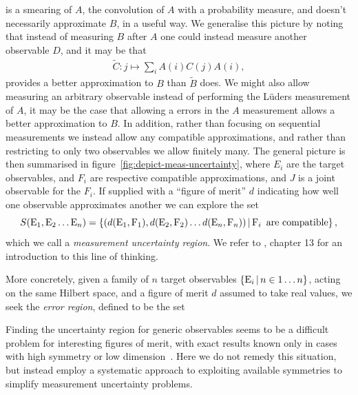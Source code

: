 is a smearing of $A$, the convolution of $A$ with a probability measure, and doesn't necessarily approximate $B$, in a useful way. We generalise this picture by noting that instead of measuring $B$ after $A$ one could instead measure another observable $D$, and it may be that
\begin{align}
  \tilde{C}:j\mapsto \sum_i A(i)C(j)A(i),
\end{align}
provides a better approximation to $B$ than $\tilde{B}$ does. We might also allow measuring an arbitrary observable instead of performing the L\"uders measurement of $A$, it may be the case that allowing a errors in the $A$ measurement allows a better approximation to $B$. In addition, rather than focusing on sequential measurements we instead allow any compatible approximations, and rather than restricting to only two observables we allow finitely many.  The general picture is then summarised in figure~\ref{fig:depict-meas-uncertainty}, where $E_i$ are the target observables, and $F_i$ are respective compatible approximations, and $J$ is a joint observable for the $F_i$. If supplied with a ``figure of merit'' $d$ indicating how well one observable approximates another we can explore the set
\begin{equation}
  S(\operatorname{E}_1, \operatorname{E}_2\hdots \operatorname{E}_n) = \left\{(d(\operatorname{E}_1, \operatorname{F}_1), d(\operatorname{E}_2, \operatorname{F}_2)\hdots d(\operatorname{E}_n, \operatorname{F}_n))\,\middle|\,\operatorname{F}_i \text{ are compatible}\right\},
  \label{eqn:general-ur-definition}
\end{equation}
which we call a \emph{measurement uncertainty region}. We refer to  \cite{quantum-measurement-busch-et-al}, chapter 13 for an introduction to this line of thinking. 


More concretely, given a family of $n$ target observables $\left\{\operatorname{E}_i\,\middle|\,n\in1\hdots n\right\}$, acting on the same Hilbert space, and a figure of merit $d$ assumed to take real values, we seek the \emph{error region}, defined to be the set

Finding the uncertainty region for generic observables seems to be a difficult problem for interesting figures of merit, with exact results known only in cases with high symmetry or low dimension~\cites{yu-oh-qubit}{dsw-meas-ur-ang-mom}. Here we do not remedy this situation, but instead employ a systematic approach to exploiting available symmetries to simplify measurement uncertainty problems. 

